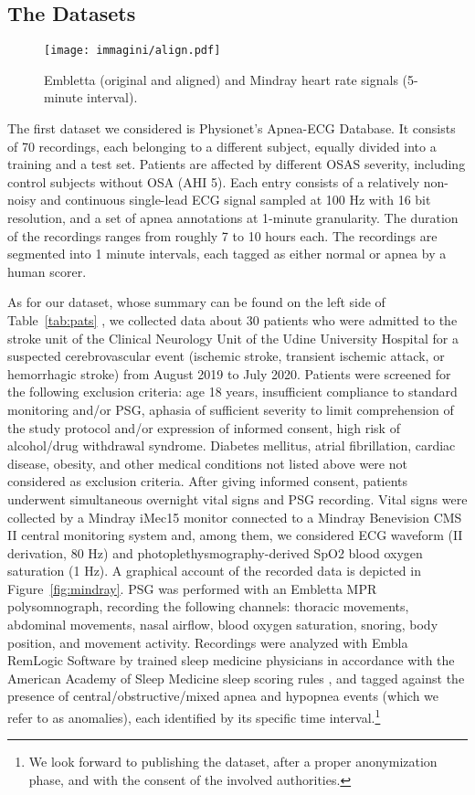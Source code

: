 \documentclass[5p,twocolumn,lefttitle]{elsarticle}
\begin{document}
\subsection{The Datasets}
\label{sec:domain}

\begin{figure}[t]
    \centering
    \texttt{[image: immagini/align.pdf]}
    \caption{Embletta (original and aligned) and Mindray heart rate signals (5-minute interval).}
    \label{fig:align}
\end{figure}

The first dataset we considered is Physionet's Apnea-ECG Database. It consists of 70 recordings, each belonging to a different subject, equally divided into a training and a test set. Patients are affected by different OSAS severity, including control subjects without OSA (AHI  5). Each entry consists of a relatively non-noisy and continuous single-lead ECG signal sampled at 100 Hz with 16 bit resolution, and a set of apnea annotations at 1-minute granularity. The duration of the recordings ranges from roughly 7 to 10 hours each. The recordings are segmented into 1 minute intervals, each tagged as either normal or apnea by a human scorer. 

As for our dataset, whose summary can be found on the left side of Table~\ref{tab:pats}
, we collected data about 30 patients who were admitted to the stroke unit of the Clinical Neurology Unit of the Udine University Hospital for a suspected cerebrovascular event (ischemic stroke, transient ischemic attack, or hemorrhagic stroke) from August 2019 to July 2020. Patients were screened for the following exclusion criteria: age 18 years, insufficient compliance to standard monitoring and/or PSG, aphasia of sufficient severity to limit comprehension of the study protocol and/or expression of informed consent, high risk of alcohol/drug withdrawal syndrome. Diabetes mellitus, atrial fibrillation, cardiac disease, obesity, and other medical conditions not listed above were not considered as exclusion criteria. 
After giving informed consent, patients 
underwent simultaneous overnight vital signs and PSG recording.
Vital signs were collected by a Mindray iMec15 monitor 
connected to a Mindray Benevision CMS II central monitoring system 
and, among them, we considered ECG waveform (II derivation, 80 Hz) and photoplethysmography-derived SpO2 blood oxygen saturation (1 Hz). A graphical account of the recorded data is depicted in Figure~\ref{fig:mindray}.
PSG was performed with an Embletta MPR polysomnograph, 
recording the following channels: thoracic movements, abdominal movements, nasal airflow, blood oxygen saturation, snoring, body position, and movement activity. Recordings were analyzed with Embla RemLogic Software 
by trained sleep medicine physicians in accordance with the American Academy of Sleep Medicine sleep scoring rules \cite{pmid23066376}, and tagged against the presence of central/obstructive/mixed apnea and hypopnea events (which we refer to as anomalies), each identified by its specific time interval.\footnote{We look forward to publishing the dataset, after a proper anonymization phase, and with the consent of the involved authorities.}
\end{document}
